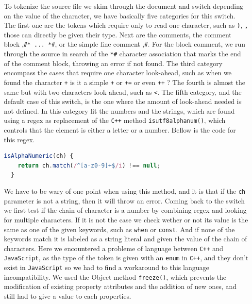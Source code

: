 \documentclass{scrbook}
\begin{document}
To tokenize the source file we skim through the document and switch depending on the value of the character, we have basically five categories for this switch.
The first one are the tokens which require only to read one character, such as \texttt{)}, \texttt{,} those can directly be given their type. Next are the comments, the comment block ,\texttt{\#* ... *\#}, or the simple line comment ,\texttt{\#}. For the block comment,
we run through the source in search of the \texttt{*\#} character association that marks the end of the comment block, throwing an error if not found. The third category encompass the cases that require one character look-ahead, such as when we found
the character \texttt{+} is it a simple \texttt{+} or \texttt{+=} or even \texttt{++} ? The fourth is almost the same but with two characters look-ahead, such as \texttt{<}. The fifth category, and the default case of this switch, is the one where the amount of look-ahead needed is not defined.
In this category fit the numbers and the strings, which are found using a regex as replacement of the \texttt{C++} method \texttt{is\textunderscore utf8\textunderscore alpha\textunderscore num()}, which controls that the element is either a letter or a number. Bellow is 
the code for this regex.

\begin{lstlisting}[language=JavaScript, gobble=2, basicstyle=\ttfamily\small]
  isAlphaNumeric(ch) {
    return ch.match(/^[a-z0-9]+$/i) !== null;
  }
\end{lstlisting}

We have to be wary of one point when using this method, and it is that if the \texttt{ch} parameter is not a string, then it will throw an error. Coming back to the switch we first test if the chain of character is a number by combining regex and looking for multiple characters.
If it is not the case we check wether or not its value is the same as one of the given keywords, such as \texttt{when} or \texttt{const}. And if none of the keywords match it is labeled as a string literal and given the value of the chain of characters. Here we encountered a probleme 
of language between \texttt{C++} and \texttt{JavaScript}, as the type of the token is given with an \texttt{enum} in \texttt{C++}, and they don't exist in \texttt{JavaScript} so we had to find a workaround to this language incompatibility. We used the Object method \texttt{freeze()}, which prevents the modification of existing property attributes and the addition of new ones, 
and still had to give a value to each properties.
\end{document}
